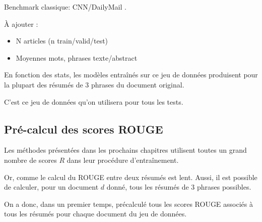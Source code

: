 
Benchmark classique: CNN/DailyMail \citep{DBLP:journals/corr/SeeLM17}.

À ajouter :

\begin{itemize}
    \item N articles (n train/valid/test)
    \item Moyennes mots, phrases texte/abstract
\end{itemize}

En fonction des stats, les modèles entraînés sur ce jeu de données produisent
pour la plupart des résumés de 3 phrases du document original.

C'est ce jeu de données qu'on utilisera pour tous les tests.

\subsection{Pré-calcul des scores ROUGE}

Les méthodes présentées dans les prochains chapitres utilisent toutes
un grand nombre de scores $R$ dans leur procédure d'entraînement.

Or, comme le calcul du ROUGE entre deux résumés est lent.
Aussi, il est possible de calculer, pour un document $d$ donné, tous les
résumés de 3 phrases possibles.

On a donc, dans un premier temps, précalculé tous les scores ROUGE
associés à tous les résumés pour chaque document du jeu de données.

